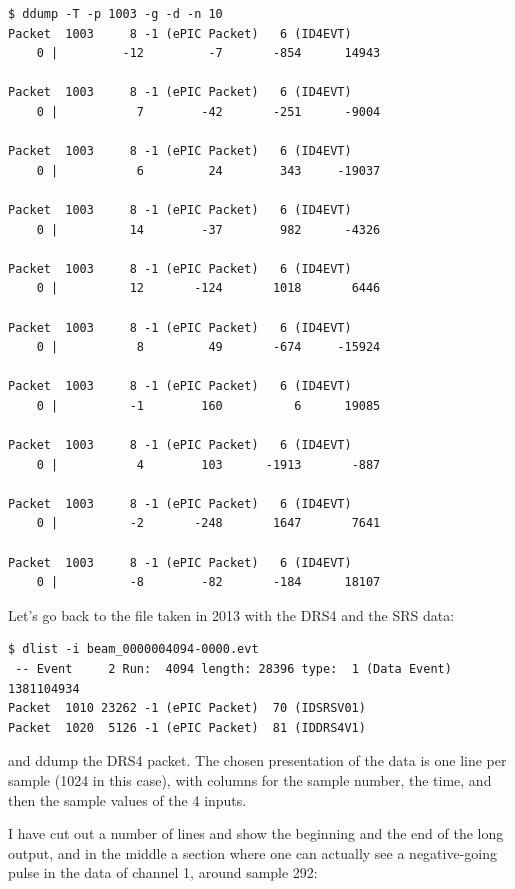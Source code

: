 \documentclass{article}[11pt]
\begin{document}
\begin{verbatim}
$ ddump -T -p 1003 -g -d -n 10
Packet  1003     8 -1 (ePIC Packet)   6 (ID4EVT)
    0 |         -12         -7       -854      14943

Packet  1003     8 -1 (ePIC Packet)   6 (ID4EVT)
    0 |           7        -42       -251      -9004

Packet  1003     8 -1 (ePIC Packet)   6 (ID4EVT)
    0 |           6         24        343     -19037

Packet  1003     8 -1 (ePIC Packet)   6 (ID4EVT)
    0 |          14        -37        982      -4326

Packet  1003     8 -1 (ePIC Packet)   6 (ID4EVT)
    0 |          12       -124       1018       6446

Packet  1003     8 -1 (ePIC Packet)   6 (ID4EVT)
    0 |           8         49       -674     -15924

Packet  1003     8 -1 (ePIC Packet)   6 (ID4EVT)
    0 |          -1        160          6      19085

Packet  1003     8 -1 (ePIC Packet)   6 (ID4EVT)
    0 |           4        103      -1913       -887

Packet  1003     8 -1 (ePIC Packet)   6 (ID4EVT)
    0 |          -2       -248       1647       7641

Packet  1003     8 -1 (ePIC Packet)   6 (ID4EVT)
    0 |          -8        -82       -184      18107

\end{verbatim}



Let's go back to the file taken in 2013 with the DRS4 and the SRS data:
\begin{verbatim}
$ dlist -i beam_0000004094-0000.evt
 -- Event     2 Run:  4094 length: 28396 type:  1 (Data Event)  1381104934
Packet  1010 23262 -1 (ePIC Packet)  70 (IDSRSV01)
Packet  1020  5126 -1 (ePIC Packet)  81 (IDDRS4V1)
\end{verbatim}

and ddump the DRS4 packet. The chosen presentation of the data
is one line per sample (1024 in this case), with columns for the
sample number, the time, and then the sample values of the 4 inputs.



I have cut out a number of lines and show the beginning and the end of
the long output, and in the middle a section where one can actually see a
negative-going pulse in the data of channel 1, around sample  292:
\end{document}
